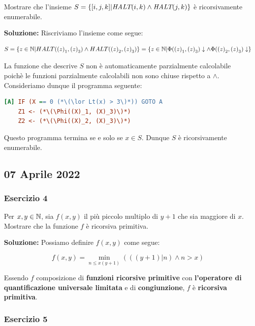 Mostrare che l'insieme \(S=\displaystyle{\left\{{[i,j,k] \vert \textit{HALT}(i,k) \land \textit{HALT}(j,k)}\right\}}\) è ricorsivamente enumerabile.

\textbf{Soluzione: } Riscriviamo l'insieme come segue:

\begin{equation}
  S=\displaystyle{\left\{{z \in \mathbb{N}\vert HALT({(z)}_1, {(z)}_3) \land HALT({(z)}_2, {(z)}_3)}\right\}}=\displaystyle{\left\{{z \in \mathbb{N}\vert \Phi({(z)}_1, {(z)}_3) \downarrow \land \Phi({(z)}_2, {(z)}_3) \downarrow}\right\}}
\end{equation}

La funzione che descrive \(S\) non è automaticamente parzialmente calcolabile poichè le funzioni parzialmente calcolabili non sono chiuse rispetto a \(\land\).
Consideriamo dunque il programma seguente:

\begin{lstlisting}[language=ini, caption={ }]
[A] IF (X == 0 (*\(\lor Lt(x) > 3\)*)) GOTO A
    Z1 <- (*\(\Phi((X)_1, (X)_3)\)*)
    Z2 <- (*\(\Phi((X)_2, (X)_3)\)*)
\end{lstlisting}

Questo programma termina se e solo se \(x \in S\). Dunque \(S\) è ricorsivamente enumerabile.

\subsection{07 Aprile 2022}

\subsubsection{Esercizio 4}

Per \(x,y \in \mathbb{N}\), sia \(f(x,y)\) il più piccolo multiplo di \(y+1\) che sia maggiore di \(x\). Mostrare che la funzione \(f\) è ricorsiva primitiva.

\textbf{Soluzione: } Possiamo definire \(f(x,y)\) come segue:

\begin{equation}
  f(x,y) = \min_{n\leq x(y+1)} ( ((y+1) \vert n) \land n > x)
\end{equation}

Essendo \(f\) composizione di \textbf{funzioni ricorsive primitive} con \textbf{l'operatore di quantificazione universale limitata} e di \textbf{congiunzione}, \(f\) è \textbf{ricorsiva primitiva}.

\subsubsection{Esercizio 5}

